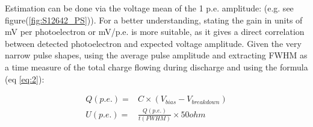 \documentclass[12pt,article,type=msc,colorback,accentcolor=tud9c]{tudthesis}
\begin{document}
Estimation can be done via the voltage mean of the 1 p.e. amplitude: (e.g. see figure(\ref{fig:S12642_PS})). For a better understanding, stating the gain in units of mV per photoelectron or mV/p.e. is more suitable, as it gives a direct correlation between detected photoelectron and expected voltage amplitude. Given the very narrow pulse shapes, using the average pulse amplitude and extracting FWHM as a time measure of the total charge flowing during discharge and using the formula (eq \ref{eq:2}):

\begin{equation}\label{eq:2}
\begin{split}
Q(p.e.) = & C \times (V_{bias}-V_{breakdown})\\
U(p.e.) = & \frac{Q(p.e.)}{t(FWHM)} \times 50ohm
\end{split}
\end{equation}
\end{document}
